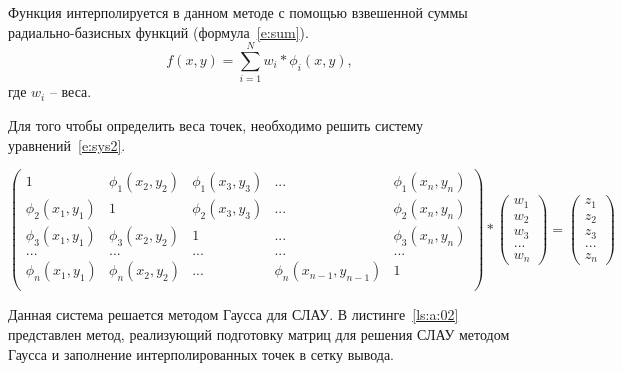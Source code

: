 Функция интерполируется в данном методе с помощью взвешенной суммы радиально-базисных функций (формула~\ref{e:sum}). 
\begin{equation} \label{e:sum}
f(x, y) = \sum ^N _{i=1} w_i*\phi_i(x,y) ,
\end{equation}
где $w_i$ -- веса.

Для того чтобы определить веса точек, необходимо решить систему уравнений~\ref{e:sys2}. 
\begin{small}
\begin{equation} \label{e:sys2}
\begin{pmatrix}
1 & \phi_1(x_2, y_2) & \phi_1(x_3, y_3) & ... & \phi_1(x_n, y_n)\\ 
\phi_2(x_1, y_1) & 1 & \phi_2(x_3, y_3) & ... & \phi_2(x_n, y_n)\\ 
\phi_3(x_1, y_1) & \phi_3(x_2, y_2) & 1 & ... & \phi_3(x_n, y_n)\\ 
... & ... & ... & ... & ... \\ 
\phi_n(x_1, y_1) & \phi_n(x_2, y_2) & ... &  \phi_n(x_{n-1}, y_{n-1}) &  1\\ 
\end{pmatrix} * \begin{pmatrix}
w_1\\ 
w_2\\ 
w_3\\ 
...\\ 
w_n
\end{pmatrix} = \begin{pmatrix}
z_1\\ 
z_2\\ 
z_3\\ 
...\\ 
z_n
\end{pmatrix}
\end{equation}
\end{small}

Данная система решается методом Гаусса для СЛАУ. В листинге~\ref{ls:a:02} представлен метод, реализующий подготовку матриц для решения СЛАУ методом Гаусса и заполнение интерполированных точек в сетку вывода.



